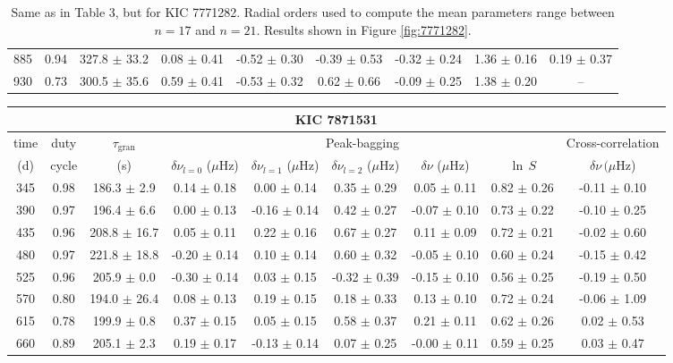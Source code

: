 \documentclass[twocolumn]{aastex61}%
\begin{document}
\begin{table}[ht]
\begin{tabular}{ccc|ccccc|c}
885 & 0.94 & 327.8 $\pm$ 33.2 & 0.08 $\pm$ 0.41 & -0.52 $\pm$ 0.30 & -0.39 $\pm$ 0.53 & -0.32 $\pm$ 0.24 & 1.36 $\pm$ 0.16 & 0.19 $\pm$ 0.37\\
930 & 0.73 & 300.5 $\pm$ 35.6 & 0.59 $\pm$ 0.41 & -0.53 $\pm$ 0.32 & 0.62 $\pm$ 0.66 & -0.09 $\pm$ 0.25 & 1.38 $\pm$ 0.20 & --\\
\end{tabular}
\parbox{2\hsize}{\caption{Same as in Table 3, but for KIC 7771282. Radial orders used to compute the mean parameters range between $n=17$ and $n=21$. Results shown in Figure \ref{fig:7771282}.}\label{tab:7771282}}
\end{table}

\begin{table}[ht]\centering\fontsize{9.}{7.}\selectfont
\begin{tabular}{ccc|ccccc|c}
\multicolumn{9}{c}{KIC 7871531}\\ \hline\hline
time & duty & $\tau_\text{gran}$ &\multicolumn{5}{c|}{Peak-bagging}&Cross-correlation\\
(d)& cycle & (s)&$\delta\nu_{l=0}$ ($\mu$Hz) & $\delta\nu_{l=1}$ ($\mu$Hz) & $\delta\nu_{l=2}$ ($\mu$Hz) & $\delta\nu$ ($\mu$Hz)& $\ln\,S$ & $\delta\nu\,(\mu$Hz)\\\hline
345 & 0.98 & 186.3 $\pm$ 2.9 & 0.14 $\pm$ 0.18 & 0.00 $\pm$ 0.14 & 0.35 $\pm$ 0.29 & 0.05 $\pm$ 0.11 & 0.82 $\pm$ 0.26 & -0.11 $\pm$ 0.10\\
390 & 0.97 & 196.4 $\pm$ 6.6 & 0.00 $\pm$ 0.13 & -0.16 $\pm$ 0.14 & 0.42 $\pm$ 0.27 & -0.07 $\pm$ 0.10 & 0.73 $\pm$ 0.22 & -0.10 $\pm$ 0.25\\
435 & 0.96 & 208.8 $\pm$ 16.7 & 0.05 $\pm$ 0.11 & 0.22 $\pm$ 0.16 & 0.67 $\pm$ 0.27 & 0.11 $\pm$ 0.09 & 0.72 $\pm$ 0.21 & -0.02 $\pm$ 0.60\\
480 & 0.97 & 221.8 $\pm$ 18.8 & -0.20 $\pm$ 0.14 & 0.10 $\pm$ 0.14 & 0.60 $\pm$ 0.32 & -0.05 $\pm$ 0.10 & 0.60 $\pm$ 0.24 & -0.15 $\pm$ 0.42\\
525 & 0.96 & 205.9 $\pm$ 0.0 & -0.30 $\pm$ 0.14 & 0.03 $\pm$ 0.15 & -0.32 $\pm$ 0.39 & -0.15 $\pm$ 0.10 & 0.56 $\pm$ 0.25 & -0.19 $\pm$ 0.50\\
570 & 0.80 & 194.0 $\pm$ 26.4 & 0.08 $\pm$ 0.13 & 0.19 $\pm$ 0.15 & 0.18 $\pm$ 0.33 & 0.13 $\pm$ 0.10 & 0.72 $\pm$ 0.24 & -0.06 $\pm$ 1.09\\
615 & 0.78 & 199.9 $\pm$ 0.8 & 0.37 $\pm$ 0.15 & 0.05 $\pm$ 0.15 & 0.58 $\pm$ 0.37 & 0.21 $\pm$ 0.11 & 0.62 $\pm$ 0.26 & 0.02 $\pm$ 0.53\\
660 & 0.89 & 205.1 $\pm$ 2.3 & 0.19 $\pm$ 0.17 & -0.13 $\pm$ 0.14 & 0.07 $\pm$ 0.25 & -0.00 $\pm$ 0.11 & 0.59 $\pm$ 0.25 & 0.03 $\pm$ 0.47\\

\end{tabular}
\end{table}
\end{document}
